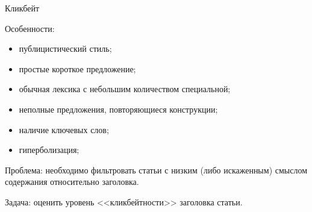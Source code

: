 


\usepackage{subcaption}



\Russian

\begin{center}
    \Large 
    Кликбейт
\end{center}

Особенности:
\begin{itemize}
    \item публицистический стиль;
    \item простые короткое предложение;
    \item обычная лексика с небольшим количеством специальной;
    \item неполные предложения, повторяющиеся конструкции;
    \item наличие ключевых слов;
    \item гиперболизация;
\end{itemize}

Проблема:​ 
необходимо фильтровать статьи с низким (либо искаженным) смыслом содержания относительно заголовка. 

Задача:​ 
оценить уровень <<кликбейтности>> заголовка статьи.



